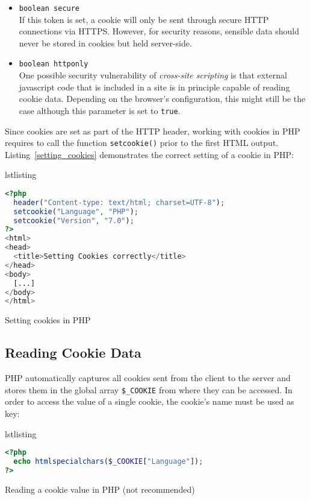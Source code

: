 \documentclass[a4paper, justified, notoc]{tufte-handout} %
\makeatletter
\newenvironment{listing}[1][htbp]
  {\ifvmode\else\unskip\fi\begin{@tufte@float}[#1]{lstlisting}{}}
  {\end{@tufte@float} } %
\makeatother
\begin{document}
\begin{itemize}
	\item \texttt{boolean secure} \\ If this token is set, a cookie will only be sent through secure HTTP connections via HTTPS. However, for security reasons, sensible data should never be stored in cookies but held server-side. 
	
	\item \texttt{boolean httponly} \\ One possible security vulnerability of \emph{cross-site scripting} is that external javascript code that is included in a site is in principle capable of reading cookie data. Depending on the browser's configuration, this might still be the case although this parameter is set to \texttt{true}. 
	
\end{itemize}

Since cookies are set as part of the HTTP header, working with cookies in PHP requires to call the function \texttt{setcookie()} prior to the first HTML output. Listing~\ref{setting_cookies} demonstrates the correct setting of a cookie in PHP:


\begin{listing}
\begin{lstlisting}[language=PHP]
<?php
  header("Content-type: text/html; charset=UTF-8");
  setcookie("Language", "PHP");
  setcookie("Version", "7.0");
?>
<html>
<head>
  <title>Setting Cookies correctly</title>
</head>
<body>
  [...]
</body>
</html>
\end{lstlisting}
	\caption{Setting cookies in PHP}
	\label{setting_cookies}
\end{listing}

\subsection{Reading Cookie Data} %
\label{sub:reading_cookie_data}
PHP automatically captures all cookies sent from the client to the server and stores them in the global array \texttt{\$\_COOKIE} from where they can be accessed. 
In order to access the value of a single cookie, the cookie's name must be used as key:
\begin{listing}
\begin{lstlisting}[language=PHP]
<?php
  echo htmlspecialchars($_COOKIE["Language"]);
?>
\end{lstlisting}
	\caption{Reading a cookie value in PHP (not recommended)}
	\label{setting_cookies}
\end{listing}
\end{document}
